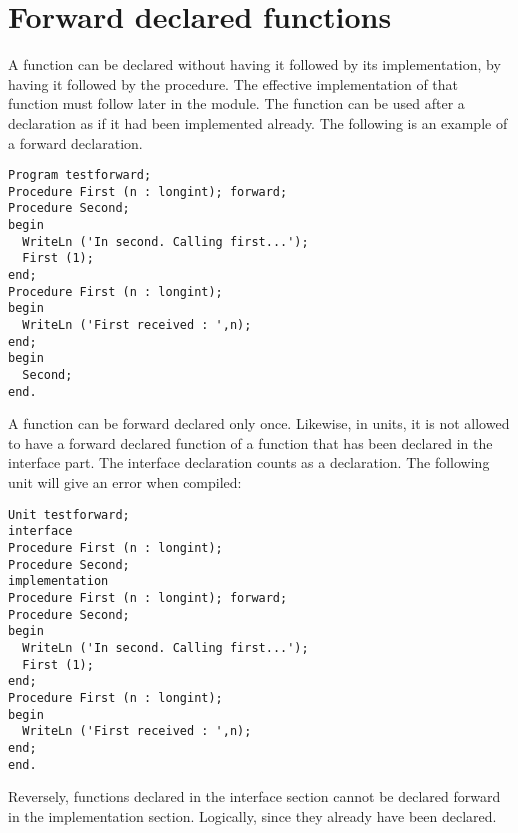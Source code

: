 \section{Forward declared functions}
 
A function can be declared without having it followed by its implementation,
by having it followed by the  procedure. The effective
implementation of that function must follow later in the module.
The function can be used after a  declaration as if it had been
implemented already.
The following is an example of a forward declaration.
\begin{verbatim}
Program testforward;
Procedure First (n : longint); forward;
Procedure Second;
begin
  WriteLn ('In second. Calling first...');
  First (1);
end;
Procedure First (n : longint);
begin
  WriteLn ('First received : ',n);
end;
begin
  Second;
end.
\end{verbatim}
A function can be forward declared only once.
Likewise, in units, it is not allowed to have a forward declared function
of a function that has been declared in the interface part. The interface
declaration counts as a  declaration.
The following unit will give an error when compiled:
\begin{verbatim}
Unit testforward;
interface
Procedure First (n : longint);
Procedure Second;
implementation
Procedure First (n : longint); forward;
Procedure Second;
begin
  WriteLn ('In second. Calling first...');
  First (1);
end;
Procedure First (n : longint);
begin
  WriteLn ('First received : ',n);
end;
end.
\end{verbatim}
Reversely, functions declared in the interface section cannot be declared
forward in the implementation section. Logically, since they already have
been declared.

